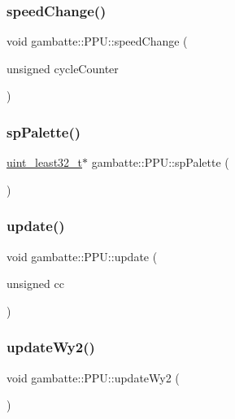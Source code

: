 \subsubsection{\texorpdfstring{speed\+Change()}{speedChange()}}
{\footnotesize\ttfamily void gambatte\+::\+P\+P\+U\+::speed\+Change (\begin{DoxyParamCaption}\item[{unsigned}]{cycle\+Counter }\end{DoxyParamCaption})}

\mbox{\label{classgambatte_1_1PPU_ae6a6686a0751e14ff4f6cd794c6aada4}} 
\subsubsection{\texorpdfstring{sp\+Palette()}{spPalette()}}
{\footnotesize\ttfamily \hyperlink{namespacegambatte_a0639f09fccfbbd5a8e0796318768e370}{uint\+\_\+least32\+\_\+t}$\ast$ gambatte\+::\+P\+P\+U\+::sp\+Palette (\begin{DoxyParamCaption}{ }\end{DoxyParamCaption})\hspace{0.3cm}{\ttfamily [inline]}}

\mbox{\label{classgambatte_1_1PPU_a0ac64d34f6537dd249f30567d0a1b593}} 
\subsubsection{\texorpdfstring{update()}{update()}}
{\footnotesize\ttfamily void gambatte\+::\+P\+P\+U\+::update (\begin{DoxyParamCaption}\item[{unsigned}]{cc }\end{DoxyParamCaption})}

\mbox{\label{classgambatte_1_1PPU_a33dbb53f8dc14f9a590777084f55d78c}} 
\subsubsection{\texorpdfstring{update\+Wy2()}{updateWy2()}}
{\footnotesize\ttfamily void gambatte\+::\+P\+P\+U\+::update\+Wy2 (\begin{DoxyParamCaption}{ }\end{DoxyParamCaption})\hspace{0.3cm}{\ttfamily [inline]}}



